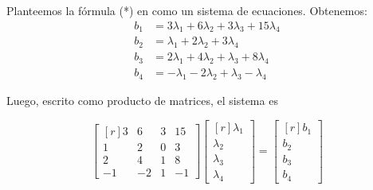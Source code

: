 \documentclass{beamer} %
\begin{document}
    \begin{frame}
        Planteemos la fórmula (*) en como un sistema de ecuaciones. Obtenemos:
        \begin{align*}
            b_1&=3\lambda_1+6\lambda_2+3\lambda_3+15\lambda_4\\
            b_2&=\lambda_1+2\lambda_2+3\lambda_4\\
            b_3&=2\lambda_1+4\lambda_2+ \lambda_3+8\lambda_4\\
            b_4&=-\lambda_1-2\lambda_2+\lambda_3-\lambda_4
        \end{align*}
        
        \pause Luego, escrito como producto de matrices, el sistema es

        \begin{equation*}
            \begin{bmatrix*}[r]    
        3&6&3&15\\
        1&2&0&3\\
        2&4&1&8\\
        -1&-2&1&-1
    \end{bmatrix*}
        \begin{bmatrix*}[r]
        \lambda_1\\
        \lambda_2\\
        \lambda_3\\
        \lambda_4
    \end{bmatrix*}
        =
        \begin{bmatrix*}[r]
        b_1\\
        b_2\\
        b_3\\
        b_4 
    \end{bmatrix*}
    \end{equation*}

    \end{frame}
\end{document}

